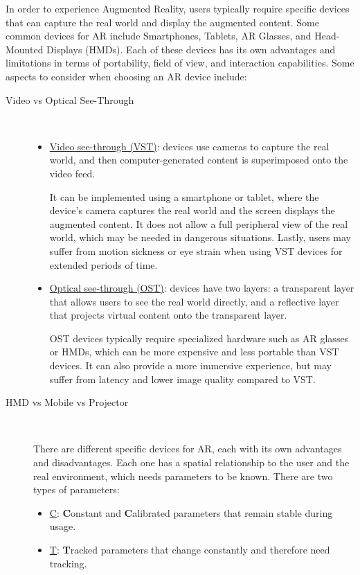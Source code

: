 In order to experience Augmented Reality, users typically require specific devices that can capture the real world and display the augmented content. Some common devices for AR include Smartphones, Tablets, AR Glasses, and Head-Mounted Displays (HMDs). Each of these devices has its own advantages and limitations in terms of portability, field of view, and interaction capabilities. Some aspects to consider when choosing an AR device include:
\begin{description}
    \item[Video vs Optical See-Through]~
    \begin{itemize}
        \item  \ul{Video see-through (VST)}: devices use cameras to capture the real world, and then computer-generated content is superimposed onto the video feed.
        
        It can be implemented using a smartphone or tablet, where the device's camera captures the real world and the screen displays the augmented content. It does not allow a full peripheral view of the real world, which may be needed in dangerous situations. Lastly, users may suffer from motion sickness or eye strain when using VST devices for extended periods of time.
        \item \ul{Optical see-through (OST)}: devices have two layers: a transparent layer that allows users to see the real world directly, and a reflective layer that projects virtual content onto the transparent layer.
        
        OST devices typically require specialized hardware such as AR glasses or HMDs, which can be more expensive and less portable than VST devices. It can also provide a more immersive experience, but may suffer from latency and lower image quality compared to VST.
    \end{itemize}

    \item[HMD vs Mobile vs Projector]~
    
    There are different specific devices for AR, each with its own advantages and disadvantages. Each one has a spatial relationship to the user and the real environment, which needs parameters to be known. There are two types of parameters:
    \begin{itemize}
        \item \ul{C}: \textbf{C}onstant and \textbf{C}alibrated parameters that remain stable during usage.
        \item \ul{T}: \textbf{T}racked parameters that change constantly and therefore need tracking.
    \end{itemize}
    

\end{description}

